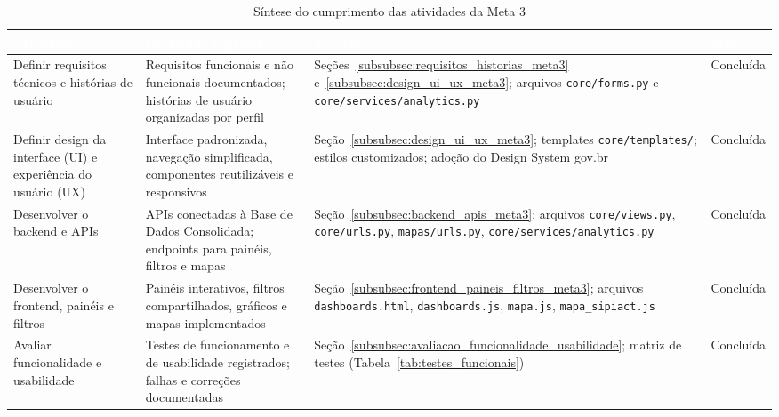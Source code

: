 \documentclass[11pt,a4paper]{article}
\begin{document}

\begin{table}[H]
\centering
\caption{Síntese do cumprimento das atividades da Meta 3}
\label{tab:sintese_meta3}
\renewcommand{\arraystretch}{1.25}
\begin{tabularx}{\textwidth}{@{}P{3.6cm}P{4.4cm}P{4.2cm}P{2.8cm}@{}}
\toprule
{}
\textcolor{white}{\textbf{Atividade}} &
\textcolor{white}{\textbf{Resultado esperado}} &
\textcolor{white}{\textbf{Evidência}} &
\textcolor{white}{\textbf{Status}} \\
\midrule

Definir requisitos técnicos e histórias de usuário &
Requisitos funcionais e não funcionais documentados; histórias de usuário organizadas por perfil &
Seções~\ref{subsubsec:requisitos_historias_meta3} e~\ref{subsubsec:design_ui_ux_meta3}; arquivos \texttt{core/forms.py} e \texttt{core/services/analytics.py} &
Concluída \\

Definir design da interface (UI) e experiência do usuário (UX) &
Interface padronizada, navegação simplificada, componentes reutilizáveis e responsivos &
Seção~\ref{subsubsec:design_ui_ux_meta3}; templates \texttt{core/templates/}; estilos customizados; adoção do Design System gov.br &
Concluída \\

Desenvolver o backend e APIs &
APIs conectadas à Base de Dados Consolidada; endpoints para painéis, filtros e mapas &
Seção~\ref{subsubsec:backend_apis_meta3}; arquivos \texttt{core/views.py}, \texttt{core/urls.py}, \texttt{mapas/urls.py}, \texttt{core/services/analytics.py} &
Concluída \\

Desenvolver o frontend, painéis e filtros &
Painéis interativos, filtros compartilhados, gráficos e mapas implementados &
Seção~\ref{subsubsec:frontend_paineis_filtros_meta3}; arquivos \texttt{dashboards.html}, \texttt{dashboards.js}, \texttt{mapa.js}, \texttt{mapa\_sipiact.js} &
Concluída \\

Avaliar funcionalidade e usabilidade &
Testes de funcionamento e de usabilidade registrados; falhas e correções documentadas &
Seção~\ref{subsubsec:avaliacao_funcionalidade_usabilidade}; matriz de testes (Tabela~\ref{tab:testes_funcionais}) &
Concluída \\


\end{tabularx}
\end{table}
\end{document}
